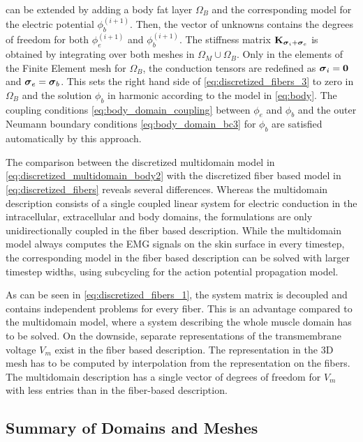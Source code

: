  can be extended by adding a body fat layer $\Omega_B$ and the corresponding model for the electric potential $\phi_b^{(i+1)}$. Then, the vector of unknowns contains the degrees of freedom for both $\phi_e^{(i+1)}$ and $\phi_b^{(i+1)}$. The stiffness matrix $\textbf{K}_{\boldsymbol{\sigma}_i + \boldsymbol{\sigma}_e}$ is obtained by integrating over both meshes in $\Omega_M \cup \Omega_B$. Only in the elements of the Finite Element mesh for $\Omega_B$, the conduction tensors are redefined as $\boldsymbol{\sigma}_i = \textbf{0}$ and $\boldsymbol{\sigma}_e = \boldsymbol{\sigma}_b$. This sets the right hand side of \cref{eq:discretized_fibers_3} to zero in $\Omega_B$ and the solution $\phi_b$ in harmonic according to the model in \cref{eq:body}. The coupling conditions \cref{eq:body_domain_coupling} between $\phi_e$ and $\phi_b$ and the outer Neumann boundary conditions \cref{eq:body_domain_bc3} for $\phi_b$ are satisfied automatically by this approach.

The comparison between the discretized multidomain model in \cref{eq:discretized_multidomain_body2} with the discretized fiber based model in \cref{eq:discretized_fibers} reveals several differences. Whereas the multidomain description consists of a single coupled linear system for electric conduction in the intracellular, extracellular and body domains, the formulations are only unidirectionally coupled in the fiber based description. While the multidomain model always computes the EMG signals on the skin surface in every timestep, the corresponding model in the fiber based description can be solved with larger timestep widths, using subcycling for the action potential propagation model.

As can be seen in \cref{eq:discretized_fibers_1}, the system matrix is decoupled and contains independent problems for every fiber. This is an advantage compared to the multidomain model, where a system describing the whole muscle domain has to be solved. On the downside, separate representations of the transmembrane voltage $V_m$ exist in the fiber based description. The representation in the 3D mesh has to be computed by interpolation from the representation on the fibers. The multidomain description has a single vector of degrees of freedom for $V_m$ with less entries than in the fiber-based description.

\subsection{Summary of Domains and Meshes}

